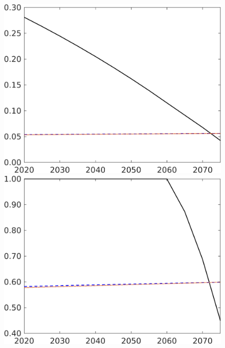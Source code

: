 \begin{figure}[h!!]
\begin{minipage}[]{0.32\textwidth}
	\end{minipage}
	\begin{minipage}[]{0.32\textwidth}
		\includegraphics[width=1\textwidth]{../../codding_model/own_basedOnFried/optimalPol_elastS_DisuSci/figures/all_1705/sff_CompEffOPT_NOT_NoTaus_spillover0_noskill1_sep1_BN0_ineq0_red0_etaa0.79_lgd0.png}
	\end{minipage}
	\begin{minipage}[]{0.32\textwidth}
		\includegraphics[width=1\textwidth]{../../codding_model/own_basedOnFried/optimalPol_elastS_DisuSci/figures/all_1705/sn_CompEffOPT_NOT_NoTaus_spillover0_noskill1_sep1_BN0_ineq0_red0_etaa0.79_lgd0.png}

\end{minipage}
\end{figure}
